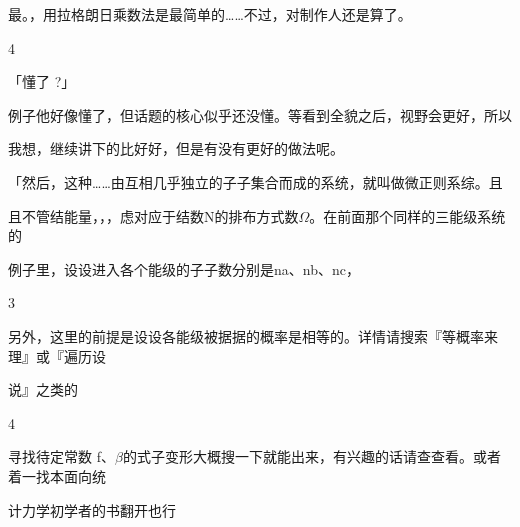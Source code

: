 最。，用拉格朗日乘数法是最简单的……不过，对制作人还是算了。\par
4\par
「懂了 ?」\par
例子他好像懂了，但话题的核心似乎还没懂。等看到全貌之后，视野会更好，所以\par
我想，继续讲下的比好好，但是有没有更好的做法呢。\par
「然后，这种……由互相几乎独立的子子集合而成的系统，就叫做微正则系综。且\par
且不管结能量，，，虑对应于结数N的排布方式数$\Omega$。在前面那个同样的三能级系统的\par
例子里，设设进入各个能级的子子数分别是na、nb、nc，\par
3\par
另外，这里的前提是设设各能级被据据的概率是相等的。详情请搜索『等概率来理』或『遍历设\par
说』之类的\par
4\par
寻找待定常数 f、$\beta$的式子变形大概搜一下就能出来，有兴趣的话请查查看。或者着一找本面向统\par
计力学初学者的书翻开也行\par

